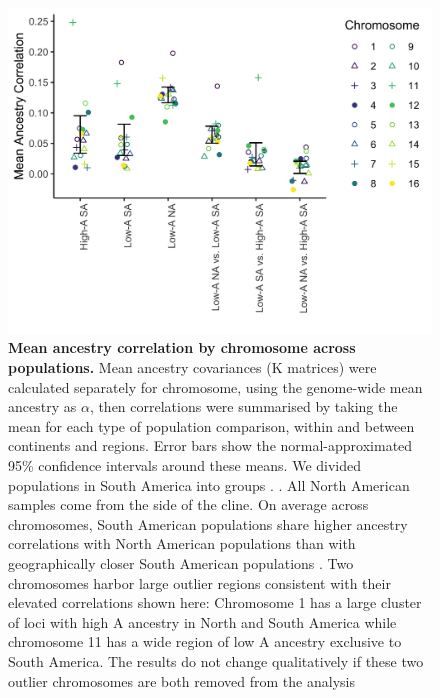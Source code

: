 \begin{figure}[ht]
\includegraphics[width=\textwidth]{chapter1/figures/mean_k_corr_by_groups_and_chr.png}
\caption{ \textbf{Mean ancestry correlation by chromosome across populations.} Mean ancestry covariances (K matrices) were calculated separately for  chromosome, using the genome-wide mean ancestry as $\alpha$, then correlations were summarised by taking the mean for each type of population comparison, within and between continents and  regions. Error bars show the normal-approximated 95\% confidence intervals around these means. We divided populations in South America into  groups . . All North American samples come from the  side of the cline. On average across chromosomes,  South American populations share higher ancestry correlations with  North American populations than with geographically closer  South American populations . Two chromosomes harbor large outlier regions consistent with their elevated correlations shown here: Chromosome 1 has a large cluster of loci with high A ancestry in North and South America while chromosome 11 has a wide region of low A ancestry exclusive to South America. The results do not change qualitatively if these two outlier chromosomes are both removed from the analysis }
\label{fig_mean_k_by_chr}
\end{figure}

